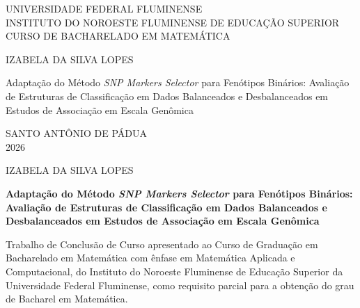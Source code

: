 \begin{center}
{UNIVERSIDADE FEDERAL FLUMINENSE \\
 INSTITUTO DO NOROESTE FLUMINENSE DE EDUCAÇÃO SUPERIOR \\
 CURSO DE BACHARELADO EM MATEMÁTICA} \\
\end{center}

\vspace{3.0cm}

\begin{center}
{IZABELA DA SILVA LOPES}
\vspace{4.5cm}

{Adaptação do Método \emph{SNP Markers Selector} para Fenótipos Binários:
Avaliação de Estruturas de Classificação em Dados Balanceados e
Desbalanceados em Estudos de Associação em Escala Genômica}
\end{center}

\vfill
\begin{center}
{SANTO ANT\^{O}NIO DE P\'{A}DUA \\ 2026}
\end{center}

\clearpage


\begin{center}
{IZABELA DA SILVA LOPES}

\vspace{2.0cm}

\textbf{Adaptação do Método \emph{SNP Markers Selector} para Fenótipos Binários:
Avaliação de Estruturas de Classificação em Dados Balanceados e
Desbalanceados em Estudos de Associação em Escala Genômica}
\end{center}

\vspace{2.0cm}

\hspace{.41\textwidth}
\begin{minipage}{.5\textwidth}
    \SingleSpacing
    Trabalho de Conclus\~{a}o de Curso apresentado ao Curso de Gradua\c{c}\~{a}o
    em Bacharelado em Matem\'{a}tica com \^{e}nfase em Matem\'{a}tica Aplicada e
    Computacional, do Instituto do Noroeste Fluminense de Educa\c{c}\~{a}o
    Superior da Universidade Federal Fluminense, como requisito parcial para a
    obten\c{c}\~{a}o do grau de Bacharel em Matem\'{a}tica.
\end{minipage}%

